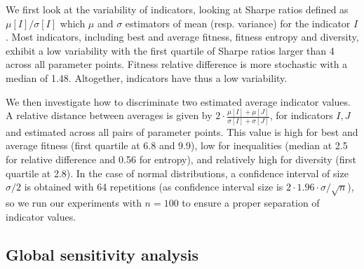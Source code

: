 \documentclass[letterpaper]{article}
\begin{document}
We first look at the variability of indicators, looking at Sharpe ratios defined as $\mu \left[ I \right] / \sigma \left[I \right]$ which $\mu$ and $\sigma$ estimators of mean (resp. variance) for the indicator $I$. Most indicators, including best and average fitness, fitness entropy and diversity, exhibit a low variability with the first quartile of Sharpe ratios larger than 4 across all parameter points. Fitness relative difference is more stochastic with a median of 1.48. Altogether, indicators have thus a low variability.

We then investigate how to discriminate two estimated average indicator values. A relative distance between averages is given by $2 \cdot \frac{\mu \left[ I \right] + \mu \left[ J \right]}{\sigma \left[I \right]+ \sigma \left[J \right]}$, for indicators $I,J$ and estimated across all pairs of parameter points. This value is high for best and average fitness (first quartile at 6.8 and 9.9), low for inequalities (median at 2.5 for relative difference and 0.56 for entropy), and relatively high for diversity (first quartile at 2.8). In the case of normal distributions, a confidence interval of size $\sigma/2$ is obtained with 64 repetitions (as confidence interval size is $2\cdot 1.96\cdot \sigma / \sqrt{n}$), so we run our experiments with $n=100$ to ensure a proper separation of indicator values.


\subsection{Global sensitivity analysis}



%
\end{document}
